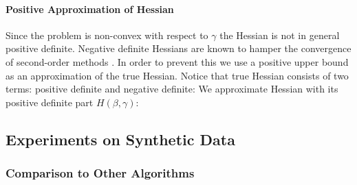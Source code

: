 \documentclass[11pt,letterpaper]{article}
\numberwithin{equation}{section} %
\numberwithin{figure}{section} %
\numberwithin{table}{section} %
\begin{document}
\paragraph{Positive Approximation of Hessian}
Since the problem is non-convex with respect to $\gamma$ the Hessian is not in general positive definite. Negative definite Hessians are known to hamper the convergence of second-order methods \cite{nocedal2006numerical}. In order to prevent this we use a positive upper bound as an approximation of the true Hessian. Notice that true Hessian consists of two terms: positive definite and negative definite: 
We approximate Hessian with its positive definite part $H(\beta, \gamma)$:

\subsection{Experiments on Synthetic Data}
\label{ch:experiments_on_synthetic_data}
\subsubsection{Comparison to Other Algorithms}
\label{ch:comparison_to_other_algo}
\end{document}
